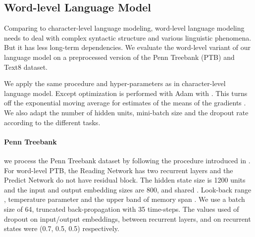 \documentclass{article} \usepackage{iclr2018_conference,times}
\begin{document}
\subsection{Word-level Language Model}
Comparing to character-level language modeling, word-level language modeling needs to deal with complex syntactic structure and various linguistic phenomena. But it has less long-term dependencies. We evaluate the word-level variant of our language model on a preprocessed version of the Penn Treebank (PTB) \citep{marcus1993building} and Text8 \citep{mahoney2011large} dataset.

We apply the same procedure and hyper-parameters as in character-level language model. Except optimization is performed with Adam with . This turns off the exponential moving average for estimates of the means of the gradients \citep{melis2017state}. We also adapt the number of hidden units, mini-batch size and the dropout rate according to the different tasks. 

\paragraph{Penn Treebank} we process the Penn Treebank dataset \citep{mikolov2012subword} by following the procedure introduced in \citep{mikolov2010recurrent}. For word-level PTB, the Reading Network has two recurrent layers and the Predict Network do not have residual block. The hidden state size is 1200 units and the input and output embedding sizes are 800, and shared \citep{inan2016tying, E17-2025}. Look-back range , temperature parameter  and the upper band of memory span . We use a batch size of 64, truncated back-propagation with 35 time-steps. The values used of dropout on input/output embeddings, between recurrent layers, and on recurrent states were (0.7, 0.5, 0.5) respectively.
\end{document}
